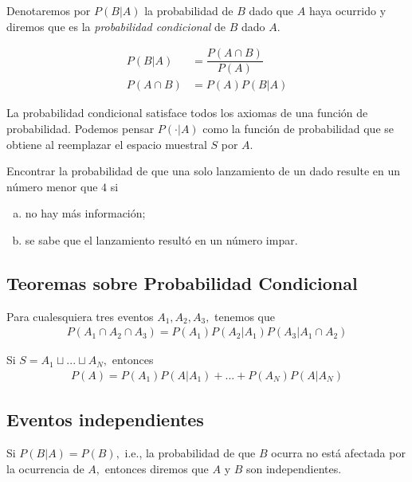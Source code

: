  Denotaremos por $P(B|A)$
 la probabilidad de $B$ dado que $A$ haya ocurrido y diremos que es la \emph{probabilidad condicional} de $B$ dado $A.$


\begin{defn}
 \begin{align}
  P(B|A)&=\dfrac{P(A\cap B)}{P(A)} \\
  P(A\cap B) &= P(A)P(B|A)
 \end{align}
\end{defn}


{}
\begin{rem}
 La probabilidad condicional satisface todos los axiomas de una función de probabilidad.  Podemos pensar $P(\cdot|A)$ como la función de probabilidad que se obtiene al reemplazar el espacio muestral $S$ por $A.$
\end{rem}


{}
\begin{ejemplo}
 \label{exmp:1.13}
 Encontrar la probabilidad de que una solo lanzamiento de un dado resulte en un número menor que $4$ si
 \begin{enumerate}[(a)]
  \item no hay más información; 
  \item se sabe que el lanzamiento resultó en un número impar.
 \end{enumerate}

\end{ejemplo}


\subsection{Teoremas sobre Probabilidad Condicional}
{}
\begin{thm}
 \label{thm:1.9}
 Para cualesquiera tres eventos $A_{1},A_{2},A_{3},$ tenemos que
 \begin{align}
  \label{1.19}
  P(A_{1} \cap A_{2} \cap A_{3})=P(A_{1})P(A_{2}|A_{1})P(A_{3}|A_{1} \cap A_{2})
 \end{align}
\end{thm}


{}
\begin{thm}
 \label{thm:1.10} Si $S=A_{1}\sqcup ... \sqcup A_{N},$  entonces
 \begin{align}
\label{1.20}
P(A)=P(A_{1})P(A|A_{1})+...+P(A_{N})P(A|A_{N})
\end{align}
\end{thm}


\subsection{Eventos independientes}
{}
Si $P(B|A)=P(B),$ i.e., la probabilidad de que $B$ ocurra no está afectada por la ocurrencia de $A,$ entonces diremos que $A$ y $B$ son independientes.


